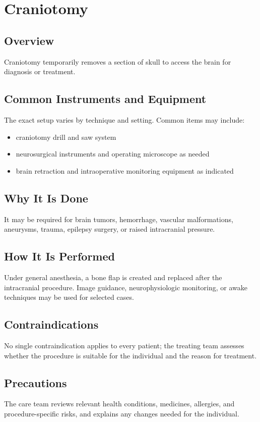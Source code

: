 \chapter{Craniotomy}
\section*{Overview}
Craniotomy temporarily removes a section of skull to access the brain for diagnosis or treatment.
\section*{Common Instruments and Equipment}
The exact setup varies by technique and setting. Common items may include:
\begin{itemize}[nosep,leftmargin=*]
  \item craniotomy drill and saw system
  \item neurosurgical instruments and operating microscope as needed
  \item brain retraction and intraoperative monitoring equipment as indicated
\end{itemize}

\section*{Why It Is Done}
It may be required for brain tumors, hemorrhage, vascular malformations, aneurysms, trauma, epilepsy surgery, or raised intracranial pressure.
\section*{How It Is Performed}
Under general anesthesia, a bone flap is created and replaced after the intracranial procedure. Image guidance, neurophysiologic monitoring, or awake techniques may be used for selected cases.
\section*{Contraindications}
No single contraindication applies to every patient; the treating team assesses whether the procedure is suitable for the individual and the reason for treatment.

\section*{Precautions}
The care team reviews relevant health conditions, medicines, allergies, and procedure-specific risks, and explains any changes needed for the individual.

